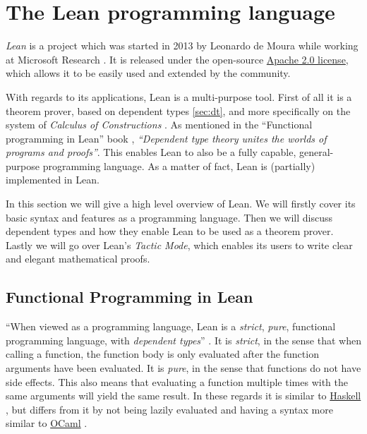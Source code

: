 \documentclass[runningheads]{llncs}
\begin{document}
\section{The Lean programming language}

\emph{Lean} is a project which was started in 2013 by Leonardo de Moura while
working at Microsoft Research \cite{theorem_proving_in_lean4}. It is released
under the open-source
\href{https://lean-lang.org/theorem_proving_in_lean4/LICENSE}{Apache 2.0
license}, which allows it to be easily used and extended by the community.

With regards to its applications, Lean is a multi-purpose tool. First of all it
is a theorem prover, based on dependent types \ref{sec:dt}, and more
specifically on the system of \emph{Calculus of Constructions}
\cite{theorem_proving_in_lean4}. As mentioned in the ``Functional programming
in Lean'' book \cite{func_prog_in_lean}, \emph{``Dependent type theory unites
the worlds of programs and proofs''}. This enables Lean to also be a fully
capable, general-purpose programming language. As a matter of fact, Lean is
(partially) implemented in Lean.

In this section we will give a high level overview of Lean. We will firstly
cover its basic syntax and features as a programming language. Then we will
discuss dependent types and how they enable Lean to be used as a theorem
prover. Lastly we will go over Lean's \emph{Tactic Mode}, which enables its
users to write clear and elegant mathematical proofs.

\subsection{Functional Programming in Lean}

``When viewed as a programming language, Lean is a \emph{strict}, \emph{pure},
functional programming language, with \emph{dependent types}''
\cite{func_prog_in_lean}. It is \emph{strict}, in the sense that when calling a
function, the function body is only evaluated after the function arguments have
been evaluated. It is \emph{pure}, in the sense that functions do not have side
effects. This also means that evaluating a function multiple times with the
same arguments will yield the same result. In these regards it is similar to
\href{https://www.haskell.org/}{Haskell} \cite{haskell}, but differs from it by
not being lazily evaluated and having a syntax more similar to
\href{https://ocaml.org/}{OCaml} \cite{ocaml}.
\end{document}
